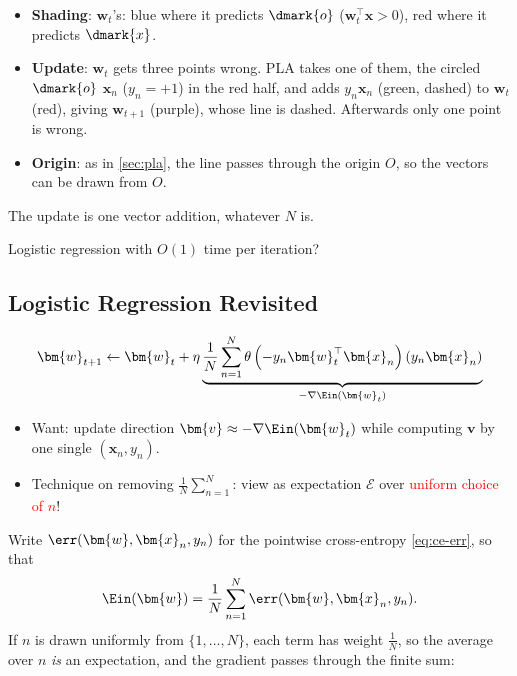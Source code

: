 \begin{center}
\begin{minipage}[c]{0.46\textwidth}
\begin{itemize}
            \item \textbf{Shading}: \(\bm{w}_t\)'s: blue where it predicts
                \(\dmark{o}\) (\(\bm{w}_t^\top \bm{x} > 0\)), red where it
                predicts \(\dmark{x}\).
            \item \textbf{Update}: \(\bm{w}_t\) gets three points wrong. PLA
                takes one of them, the circled \(\dmark{o}\) \(\bm{x}_n\) (\(y_n
                = +1\)) in the red half, and adds \(y_n \bm{x}_n\) (green,
                dashed) to \(\bm{w}_t\) (red), giving \(\bm{w}_{t+1}\) (purple),
                whose line is dashed. Afterwards only one point is wrong.
            \item \textbf{Origin}: as in \autoref{sec:pla}, the line passes
                through the origin \(O\), so the vectors can be drawn from
                \(O\).
        \end{itemize}
        The update is one vector addition, whatever \(N\) is.
    \end{minipage}
\end{center}

\begin{question}
    Logistic regression with \(O(1)\) time per iteration?
\end{question}

\subsection{Logistic Regression Revisited}

\[
    \bm{w}_{t+1} \gets \bm{w}_t + \eta \underbrace{\frac{1}{N} \sum_{n=1}^N
    \theta \left( -y_n \bm{w}_t^\top \bm{x}_n \right) \left( y_n \bm{x}_n
    \right)}_{-\nabla \Ein(\bm{w}_t)}
\]
\begin{itemize}
    \item Want: update direction \(\bm{v} \approx -\nabla \Ein(\bm{w}_t)\)
        while computing \(\bm{v}\) by \textcolor{orange!85!black}{one single
        \((\bm{x}_n, y_n)\)}.
    \item Technique on removing \(\frac{1}{N} \sum_{n=1}^N\): view as
        expectation \(\mathcal{E}\) over \textcolor{red}{uniform choice of
        \(n\)}!
\end{itemize}

Write \(\err(\bm{w}, \bm{x}_n, y_n)\) for the pointwise cross-entropy
\eqref{eq:ce-err}, so that
\[
    \Ein(\bm{w}) = \frac{1}{N} \sum_{n=1}^N \err(\bm{w}, \bm{x}_n, y_n) .
\] If \(n\) is drawn uniformly from \(\{1, \dots , N\}\), each
term has weight \(\frac{1}{N}\), so the average over \(n\) \emph{is} an
expectation, and the gradient passes through the finite sum:

